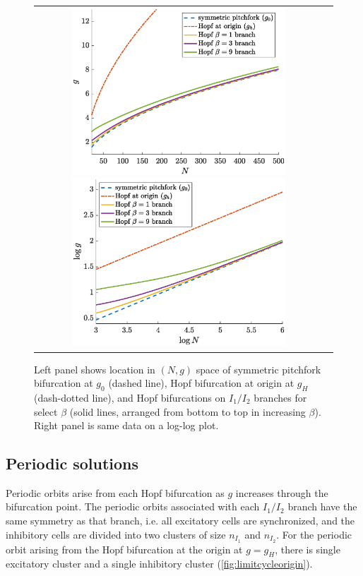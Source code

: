 \documentclass[11pt,reqno]{amsart}
\begin{document}
\begin{figure}
    \centering
    \begin{tabular}{cc}
    \includegraphics[width=8cm]{images/HopfNvsg.eps}
    \includegraphics[width=8cm]{images/HopflogNvslogg.eps}
    \end{tabular}
    \caption{Left panel shows location in $(N, g)$ space of symmetric pitchfork bifurcation at $g_0$ (dashed line), Hopf bifurcation at origin at $g_H$ (dash-dotted line), and Hopf bifurcations on $I_1/I_2$ branches for select $\beta$ (solid lines, arranged from bottom to top in increasing $\beta$). Right panel is same data on a log-log plot.}
    \label{fig:Hopfplots}
\end{figure}

\subsection{Periodic solutions}

Periodic orbits arise from each Hopf bifurcation as $g$ increases through the bifurcation point. The periodic orbits associated with each $I_1/I_2$ branch have the same symmetry as that branch, i.e. all excitatory cells are synchronized, and the inhibitory cells are divided into two clusters of size $n_{I_1}$ and $n_{I_2}$. For the periodic orbit arising from the Hopf bifurcation at the origin at $g = g_H$, there is single excitatory cluster and a single inhibitory cluster (\cref{fig:limitcycleorigin}). 
\end{document}
